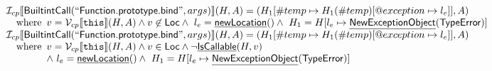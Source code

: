 \documentclass{article}
\makeatletter
\newcommand{\SF}[1]{\mbox{\textsf{#1}}}
\newcommand{\TT}[1]{\mbox{\texttt{#1}}}
\newcommand{\wherec}[1]{{\rm where}\begin{array}[t]{l}#1\end{array}}
\newcommand{\I}{\mathcal{I}}
\newcommand{\V}{\mathcal{V}}
\newcommand{\lbr}{\llbracket}
\newcommand{\rbr}{\rrbracket}
\newcommand{\hf}[1]{\underline{\sf #1}}
\newcommand{\varloc}[1]{\##1}
\newcommand{\varprop}[1]{@#1}
\makeatother
\begin{document}
\[\begin{array}{l}
\I _{cp}\lbr \SF{BuiltintCall}(``\SF{Function.prototype.bind}",args)\rbr(H,A)
 = (H_1[\varloc{temp}\mapsto H_1(\varloc{temp})[\varprop{exception}\mapsto l_e]], A) \\
\quad\wherec{
  v = \V _{cp}\lbr \TT{this}\rbr (H,A) \land v \not\in \SF{Loc}
  \land\ l_e = \hf{newLocation}() \land\ H_1=H[l_e\mapsto\hf{NewExceptionObject}(\SF{TypeError})] 
  }\\
  
\I _{cp}\lbr \SF{BuiltintCall}(``\SF{Function.prototype.bind}",args)\rbr(H,A)
 = (H_1[\varloc{temp}\mapsto H_1(\varloc{temp})[\varprop{exception}\mapsto l_e]], A) \\
\quad\wherec{
  v = \V _{cp}\lbr \TT{this}\rbr (H,A) \land v \in \SF{Loc} \land \neg \hf{IsCallable}(H,v)\\
  \land\ l_e = \hf{newLocation}() \land\ H_1=H[l_e\mapsto\hf{NewExceptionObject}(\SF{TypeError})] 
  }\\
  
\end{array}
\]
\end{document}

